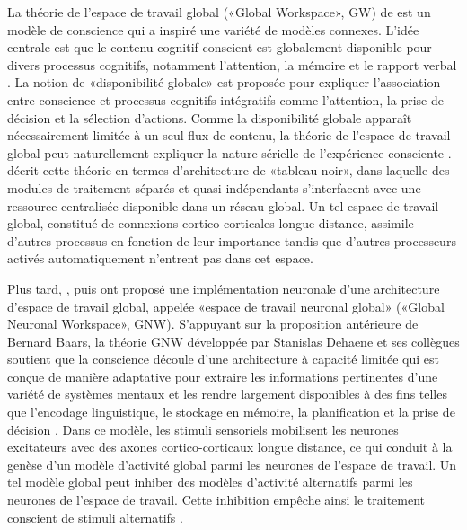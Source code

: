 La théorie de l'espace de travail global («Global Workspace», GW) de \cite{baars1993cognitive} est un modèle de conscience qui a inspiré une variété de modèles connexes. 
L'idée centrale est que le contenu cognitif conscient est globalement disponible pour divers processus cognitifs, notamment l'attention, la mémoire et le rapport verbal \citep{baars1993cognitive}. 
La notion de «disponibilité globale» est proposée pour expliquer l'association entre conscience et processus cognitifs intégratifs comme l'attention, la prise de décision et la sélection d'actions. 
Comme la disponibilité globale apparaît nécessairement limitée à un seul flux de contenu, la théorie de l'espace de travail global peut naturellement expliquer la nature sérielle de l'expérience consciente \citep{seth2007models}. 
\cite{baars1993cognitive} décrit cette théorie en termes d'architecture de «tableau noir», dans laquelle des modules de traitement séparés et quasi-indépendants s'interfacent avec une ressource centralisée disponible dans un réseau global. 
Un tel espace de travail global, constitué de connexions cortico-corticales longue distance, assimile d'autres processus en fonction de leur importance tandis que d'autres processeurs activés automatiquement n'entrent pas dans cet espace. 

Plus tard, \cite{dehaene1998neuronal}, puis \cite{dehaene2003neuronal} ont proposé une implémentation neuronale d'une architecture d'espace de travail global, appelée «espace de travail neuronal global» («Global Neuronal Workspace», GNW). 
S'appuyant sur la proposition antérieure de Bernard Baars, la théorie GNW développée par Stanislas Dehaene et ses collègues soutient que la conscience découle d'une architecture à capacité limitée qui est conçue de manière adaptative pour extraire les informations pertinentes d'une variété de systèmes mentaux et les rendre largement disponibles à des fins telles que l'encodage linguistique, le stockage en mémoire, la planification et la prise de décision \citep{dehaene2001towards, dehaene2011experimental, dehaene2014toward, dehaene2014consciousness}. 
Dans ce modèle, les stimuli sensoriels mobilisent les neurones excitateurs avec des axones cortico-corticaux longue distance, ce qui conduit à la genèse d'un modèle d'activité global parmi les neurones de l'espace de travail. 
Un tel modèle global peut inhiber des modèles d'activité alternatifs parmi les neurones de l'espace de travail. 
Cette inhibition empêche ainsi le traitement conscient de stimuli alternatifs \citep{dehaene1998neuronal, dehaene2003neuronal}. 

